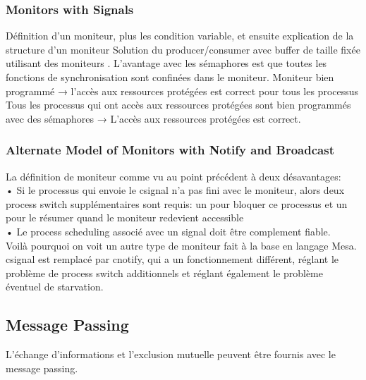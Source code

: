 \subsubsection{Monitors with Signals}
Définition d'un moniteur, plus les condition variable, et ensuite explication de la structure d'un moniteur \cite[p.~248]{stallings}
Solution du producer/consumer avec buffer de taille fixée utilisant des moniteurs \cite[p.~249]{stallings}.
L'avantage avec les sémaphores est que toutes les fonctions de synchronisation sont confinées dans le moniteur.
Moniteur bien programmé → l'accès aux ressources protégées est correct pour tous les processus
Tous les processus qui ont accès aux ressources protégées sont bien programmés avec des sémaphores → L'accès aux ressources protégées est correct.
\subsubsection{Alternate Model of Monitors with Notify and Broadcast}
La définition de moniteur comme vu au point précédent à deux désavantages: \\
• Si le processus qui envoie le csignal n'a pas fini avec le moniteur, alors deux process switch supplémentaires sont requis: un pour bloquer ce processus et un pour le résumer quand le moniteur redevient accessible \\
• Le process scheduling associé avec un signal doit être complement fiable. \\
Voilà pourquoi on voit un autre type de moniteur fait à la base en langage Mesa. csignal est remplacé par cnotify, qui a un fonctionnement différent, réglant le problème de process switch additionnels et réglant également le problème éventuel de starvation.
\subsection{Message Passing}
L'échange d'informations et l'exclusion mutuelle peuvent être fournis avec le message passing.
